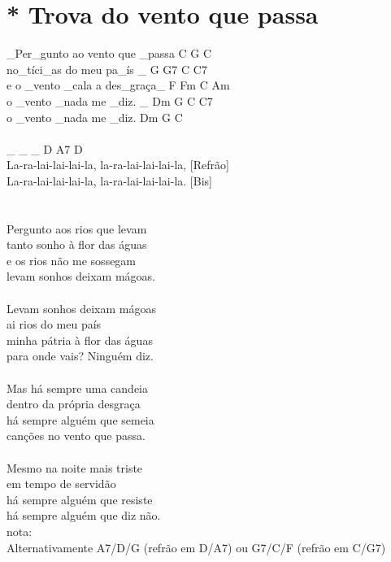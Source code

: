 \documentclass{article}
\begin{document}
\section{ * Trova do vento que passa}
_Per_gunto ao vento que _passa       C G  C\\
no_tíci_as do meu pa_ís _              G G7 C C7\\
e o _vento _cala a des_graça_         F Fm C Am \\
o _vento _nada me _diz. _             Dm G C C7\\
o _vento _nada me _diz.              Dm G C\\
\\
_ _ _                               D A7 D\\
La-ra-lai-lai-lai-la, la-ra-lai-lai-lai-la, [Refrão]\\
La-ra-lai-lai-lai-la, la-ra-lai-lai-lai-la. [Bis]\\
\\
\\
Pergunto aos rios que levam\\
tanto sonho à flor das águas\\
e os rios não me sossegam\\
levam sonhos deixam mágoas.\\
\\
Levam sonhos deixam mágoas\\
ai rios do meu país\\
minha pátria à flor das águas\\
para onde vais? Ninguém diz.\\
\\
Mas há sempre uma candeia\\
dentro da própria desgraça\\
há sempre alguém que semeia\\
canções no vento que passa.\\
\\
Mesmo na noite mais triste\\
em tempo de servidão\\
há sempre alguém que resiste\\
há sempre alguém que diz não.\\
nota:\\
Alternativamente A7/D/G (refrão em D/A7) ou G7/C/F (refrão em C/G7)\\
\end{document}
